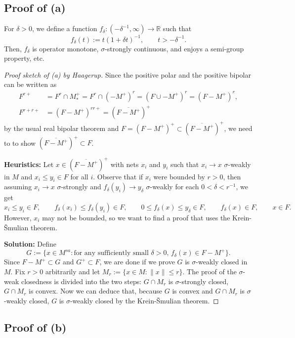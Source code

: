 \documentclass{../../../../small}
\begin{document}
\subsection{Proof of (a)}


\begin{definition*}
For $\delta>0$, we define a function $f_\delta:(-\delta^{-1},\infty)\to\mathbb{R}$ such that
\[f_\delta(t):=t(1+\delta t)^{-1},\qquad t>-\delta^{-1}.\]
Then, $f_\delta$ is operator monotone, $\sigma$-strongly continuous, and enjoys a semi-group property, etc.
\end{definition*}

\begin{proof}[Proof sketch of (a) by Haagerup]
Since the positive polar and the positive bipolar can be written as
\begin{align*}
F^{r+}&=F^r\cap M_*^+=F^r\cap(-M^+)^r=(F\cup-M^+)^r=(F-M^+)^r,\\
F^{r+r+}&=(F-M^+)^{rr+}=(\overline{F-M^+})^+
\end{align*}
by the usual real bipolar theorem and $F=(F-M^+)^+\subset(\overline{F-M^+})^+$, we need to to show $(\overline{F-M^+})^+\subset F$.

\textbf{Heuristics:}
Let $x\in(\overline{F-M^+})^+$ with nets $x_i$ and $y_i$ such that $x_i\to x$ $\sigma$-weakly in $M$ and $x_i\le y_i\in F$ for all $i$.
Observe that if $x_i$ were bounded by $r>0$, then assuming $x_i\to x$ $\sigma$-strongly and $f_\delta(y_i)\to y_\delta$ $\sigma$-weakly for each $0<\delta<r^{-1}$, we get
\[x_i\le y_i\in F,\qquad f_\delta(x_i)\le f_\delta(y_i)\in F,\qquad 0\le f_\delta(x)\le y_\delta\in F,\qquad f_\delta(x)\in F,\qquad x\in F.\]
However, $x_i$ may not be bounded, so we want to find a proof that uses the Krein-\v Smulian theorem.

\textbf{Solution:}
Define
\[G:=\{x\in M^{sa}:\text{for any sufficiently small $\delta>0$, $f_\delta(x)\in F-M^+$}\}.\]
Since $F-M^+\subset G$ and $G^+\subset F$, we are done if we prove $G$ is $\sigma$-weakly closed in $M$.
Fix $r>0$ arbitrarily and let $M_r:=\{x\in M:\|x\|\le r\}$.
The proof of the $\sigma$-weak closedness is divided into the two steps: $G\cap M_r$ is $\sigma$-strongly closed, $G\cap M_r$ is convex.
Now we can deduce that, because $G$ is convex and $G\cap M_r$ is $\sigma$-weakly closed, $G$ is $\sigma$-weakly closed by the Krein-\v Smulian theorem.
\end{proof}


\subsection{Proof of (b)}
\end{document}
